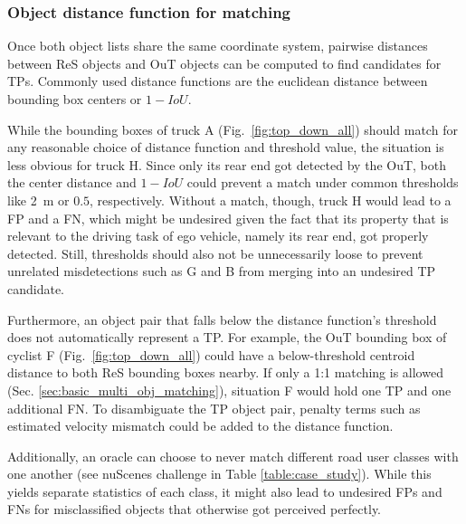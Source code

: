 \documentclass[conference]{IEEEtran}
\begin{document}
\subsubsection{Object distance function for matching}
\label{sec:basic_dist_func}

Once both object lists share the same coordinate system, pairwise distances between ReS objects and OuT objects can be computed to find candidates for TPs. 
Commonly used distance functions are the euclidean distance between bounding box centers or $1 - IoU$. %


While the bounding boxes of truck A (Fig.~\ref{fig:top_down_all}) should match for any reasonable choice of distance function and threshold value, the situation is less obvious for truck H.
Since only its rear end got detected by the OuT, both the center distance and $1 - IoU$ could prevent a match under common thresholds like \SI{2}{\metre} or $0.5$, respectively. 
Without a match, though, truck H would lead to a FP and a FN, which might be undesired given the fact that its property that is relevant to the driving task of ego vehicle, namely its rear end, got properly detected. 
Still, thresholds should also not be unnecessarily loose to prevent unrelated misdetections such as G and B from merging into an undesired TP candidate.


Furthermore, an object pair that falls below the distance function's threshold does not automatically represent a TP. 
For example, the OuT bounding box of cyclist F (Fig.~\ref{fig:top_down_all}) could have a below-threshold centroid distance to both ReS bounding boxes nearby. 
If only a 1:1 matching is allowed (Sec. \ref{sec:basic_multi_obj_matching}), situation F would hold one TP and one additional FN.
To disambiguate the TP object pair, penalty terms such as estimated velocity mismatch could be added to the distance function.

Additionally, an oracle can choose to never match different road user classes with one another (see nuScenes challenge in Table \ref{table:case_study}). 
While this yields separate statistics of each class, it might also lead to undesired FPs and FNs for misclassified objects that otherwise got perceived perfectly.
\end{document}

